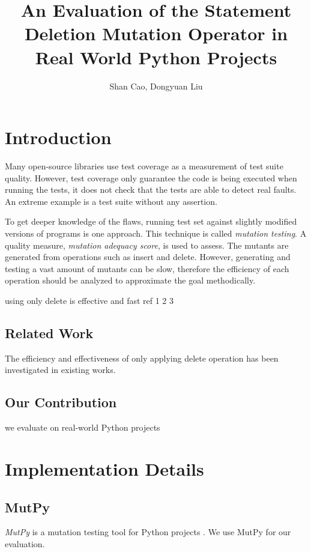 \documentclass[12pt]{article}
\title{\textbf{An Evaluation of the Statement Deletion Mutation Operator in Real World Python Projects}}
\author{Shan Cao, Dongyuan Liu}
\begin{document}
\maketitle
\tableofcontents

\section{Introduction}

Many open-source libraries use test coverage as a measurement of test suite quality. However, test coverage only guarantee the code is being executed when running the tests, it does not check that the tests are able to detect real faults. An extreme example is a test suite without any assertion.

To get deeper knowledge of the flaws, running test set against slightly modified versions of programs is one approach\cite{}. This technique is called \emph{mutation testing}. A quality measure, \emph{mutation adequacy score}, is used to assess. The mutants are generated from operations such as insert and delete. However, generating and testing a vast amount of mutants can be slow, therefore the efficiency of each operation should be analyzed to approximate the goal methodically.

using only delete is effective and fast ref 1 2 3

\subsection{Related Work}

The efficiency and effectiveness of only applying delete operation has been investigated in existing works.

\subsection{Our Contribution}

we evaluate on real-world Python projects

\section{Implementation Details}

\subsection{MutPy}

\emph{MutPy} is a mutation testing tool for Python projects \cite{mutpy}. We use MutPy for our evaluation.
\end{document}
